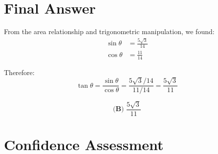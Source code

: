 \documentclass[12pt]{article}
\begin{document}
\section*{Final Answer}

From the area relationship and trigonometric manipulation, we found:
\begin{align*}
    \sin\theta &= \frac{5\sqrt{3}}{14} \\
    \cos\theta &= \frac{11}{14}
\end{align*}

Therefore:
$$\tan\theta = \frac{\sin\theta}{\cos\theta} = \frac{5\sqrt{3}/14}{11/14} = \frac{5\sqrt{3}}{11}$$

$$\boxed{\textbf{(B) } \frac{5\sqrt{3}}{11}}$$

\section*{Confidence Assessment}
\end{document}
